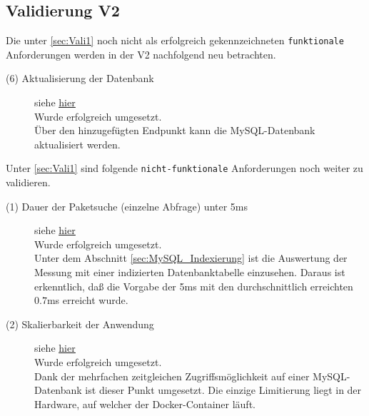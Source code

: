 \subsection{Validierung V2} \label{sec:Vali2}
    Die unter \ref{sec:Vali1}  noch nicht als erfolgreich gekennzeichneten \texttt{funktionale} Anforderungen werden in der V2 nachfolgend neu betrachten.

    \begin{description}
        \item[(6) Aktualisierung der Datenbank] siehe \hyperref[f:six]{\underline{hier}} \hfill \\
            Wurde erfolgreich umgesetzt.
            \\
            Über den hinzugefügten Endpunkt kann die MySQL-Datenbank aktualisiert werden.
    \end{description}

    \noindent Unter \ref{sec:Vali1}  sind folgende \texttt{nicht-funktionale} Anforderungen noch weiter zu validieren.

    \begin{description}
        \item[(1) Dauer der Paketsuche (einzelne Abfrage) unter 5ms] siehe \hyperref[nf:one]{\underline{hier}} \hfill \\
            Wurde erfolgreich umgesetzt.
            \\
            Unter dem Abschnitt \ref{sec:MySQL_Indexierung} ist die Auswertung der Messung mit einer indizierten Datenbanktabelle einzusehen.
            Daraus ist erkenntlich, daß die Vorgabe der 5ms mit den durchschnittlich erreichten $0.7$ms erreicht wurde.
        \item[(2) Skalierbarkeit der Anwendung] siehe \hyperref[nf:two]{\underline{hier}} \hfill \\
            Wurde erfolgreich umgesetzt.
            \\
            Dank der mehrfachen zeitgleichen Zugriffsmöglichkeit auf einer MySQL-Datenbank ist dieser Punkt umgesetzt.
            Die einzige Limitierung liegt in der Hardware, auf welcher der Docker-Container läuft.
    \end{description}

